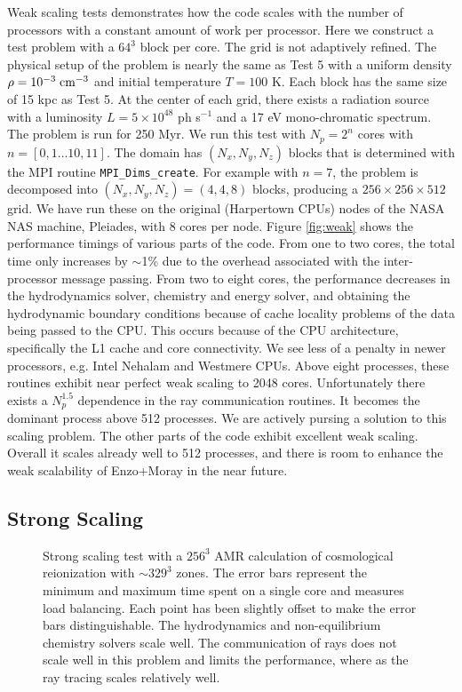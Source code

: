 \documentclass[useAMS,usenatbib]{mn2e}
\begin{document}
Weak scaling tests demonstrates how the code scales with the number of
processors with a constant amount of work per processor.  Here we
construct a test problem with a $64^3$ block per core.  The grid is
not adaptively refined.  The physical setup of the problem is nearly
the same as Test 5 with a uniform density $\rho = 10^{-3} \;\cubecm$
and initial temperature $T = 100$ K.  Each block has the same size of
15 kpc as Test 5.  At the center of each grid, there exists a
radiation source with a luminosity $L = 5 \times 10^{48}$ ph s$^{-1}$
and a 17 eV mono-chromatic spectrum.  The problem is run for 250 Myr.
We run this test with $N_p = 2^n$ cores with $n = [0,1 \dots 10,11]$.
The domain has $(N_x, N_y, N_z)$ blocks that is determined with the
MPI routine \texttt{MPI\_Dims\_create}.  For example with $n = 7$, the
problem is decomposed into $(N_x, N_y, N_z) = (4,4,8)$ blocks,
producing a $256 \times 256 \times 512$ grid.  We have run these on
the original (Harpertown CPUs) nodes of the NASA NAS machine,
Pleiades, with 8 cores per node.  Figure \ref{fig:weak} shows the
performance timings of various parts of the code.  From one to two
cores, the total time only increases by $\sim$1\% due to the overhead
associated with the inter-processor message passing.  From two to
eight cores, the performance decreases in the hydrodynamics solver,
chemistry and energy solver, and obtaining the hydrodynamic boundary
conditions because of cache locality problems of the data being passed
to the CPU.  This occurs because of the CPU architecture, specifically
the L1 cache and core connectivity.  We see less of a penalty in newer
processors, e.g. Intel Nehalam and Westmere CPUs.  Above eight
processes, these routines exhibit near perfect weak scaling to 2048
cores.  Unfortunately there exists a $N_p^{1.5}$ dependence in the ray
communication routines.  It becomes the dominant process above 512
processes.  We are actively pursing a solution to this scaling
problem.  The other parts of the code exhibit excellent weak scaling.
Overall it scales already well to 512 processes, and there is room to
enhance the weak scalability of Enzo+Moray in the near future.

\subsection{Strong Scaling}
\label{sec:strong_sc}

\begin{figure}
  \caption{\label{fig:strong} Strong scaling test with a $256^3$ AMR
    calculation of cosmological reionization with $\sim329^3$ zones.
    The error bars represent the minimum and maximum time spent on a
    single core and measures load balancing.  Each point has been
    slightly offset to make the error bars distinguishable.  The
    hydrodynamics and non-equilibrium chemistry solvers scale well.
    The communication of rays does not scale well in this problem and
    limits the performance, where as the ray tracing scales relatively
    well.}
\end{figure}
\end{document}

